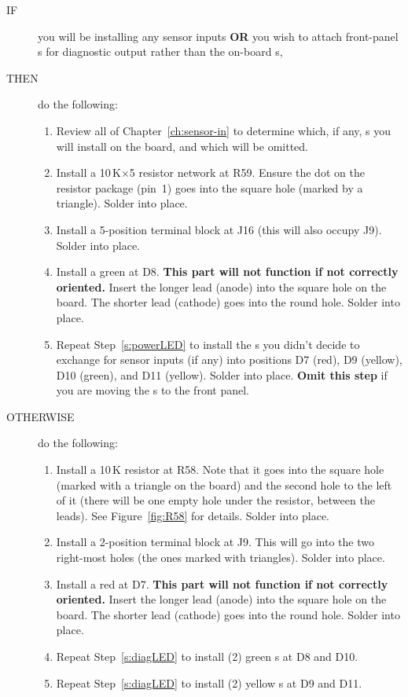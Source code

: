 \documentclass[letterpaper,twoside,onecolumn,openright,final]{memoir}
\begin{document}
\begin{description}
\item[IF] 
	you will be installing any sensor inputs 
	{\bfseries OR} you wish to attach front-panel s for diagnostic output rather than
	the on-board s,
\item[THEN] do the following:
	\begin{enumerate}
	\item	Review all of Chapter~\ref{ch:sensor-in} to determine which, if any, s you
		will install on the board, and which will be omitted.
	\item	Install a 10\,K$\times$5 resistor network at R59.  Ensure the dot on the resistor package
		(pin~1) goes into the square hole (marked by a triangle).  Solder into place.
	\item	Install a 5-position terminal block at J16 (this will also occupy J9).  Solder into place.
	\item\label{s:powerLED}
		Install a green  at D8. {\bfseries This part will not function if not
		correctly oriented.} Insert the longer lead (anode) into the square hole on the
		board. The shorter lead (cathode) goes into the round hole. Solder into place.
	\item	Repeat Step~\ref{s:powerLED} to install the s you didn't decide 
		to exchange for sensor inputs (if any) into positions D7 (red), D9 (yellow),
		D10 (green), and D11 (yellow).  Solder into place.  {\bfseries Omit this step}
		if you are moving the s to the front panel.
	\end{enumerate}
\item[OTHERWISE] do the following:
	\begin{enumerate}
	\item	Install a 10\,K resistor at R58.  Note that it goes into the square hole (marked with a
		triangle on the board) and the second hole to the left of it (there will be one empty hole
		under the resistor, between the leads).  See Figure~\ref{fig:R58} for details.  Solder
		into place.
	\item	Install a 2-position terminal block at J9.  This will go into the two right-most holes
		(the ones marked with triangles).  Solder into place.
	\item\label{s:diagLED}
		Install a red  at D7.  {\bfseries This part will not function if not
		correctly oriented.} Insert the longer lead (anode) into the square hole on the	
		board. The shorter lead (cathode) goes into the round hole.  Solder into place.
	\item   Repeat Step~\ref{s:diagLED} to install (2) green s at D8 and D10.
	\item   Repeat Step~\ref{s:diagLED} to install (2) yellow s at D9 and D11.
	\end{enumerate}
\end{description}
\end{document}
